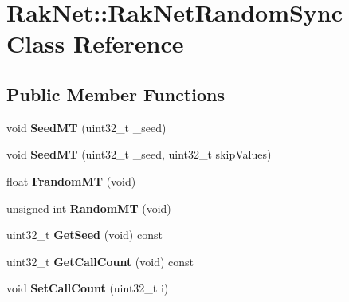 \hypertarget{class_rak_net_1_1_rak_net_random_sync}{\section{Rak\-Net\-:\-:Rak\-Net\-Random\-Sync Class Reference}
\label{class_rak_net_1_1_rak_net_random_sync}
}
\subsection*{Public Member Functions}
\begin{DoxyCompactItemize}
\item 
\hypertarget{class_rak_net_1_1_rak_net_random_sync_a60d45fe122a17dfc529191648cf7b9bb}{void {\bfseries Seed\-M\-T} (uint32\-\_\-t \-\_\-seed)}\label{class_rak_net_1_1_rak_net_random_sync_a60d45fe122a17dfc529191648cf7b9bb}

\item 
\hypertarget{class_rak_net_1_1_rak_net_random_sync_a207b74cdf4ad38f7853651647d5cb5b6}{void {\bfseries Seed\-M\-T} (uint32\-\_\-t \-\_\-seed, uint32\-\_\-t skip\-Values)}\label{class_rak_net_1_1_rak_net_random_sync_a207b74cdf4ad38f7853651647d5cb5b6}

\item 
\hypertarget{class_rak_net_1_1_rak_net_random_sync_a80dbe995268076fe3fe9ec5b611d093b}{float {\bfseries Frandom\-M\-T} (void)}\label{class_rak_net_1_1_rak_net_random_sync_a80dbe995268076fe3fe9ec5b611d093b}

\item 
\hypertarget{class_rak_net_1_1_rak_net_random_sync_add8a287303d50fd202e1e52ba598a3d8}{unsigned int {\bfseries Random\-M\-T} (void)}\label{class_rak_net_1_1_rak_net_random_sync_add8a287303d50fd202e1e52ba598a3d8}

\item 
\hypertarget{class_rak_net_1_1_rak_net_random_sync_ab79dfe0f144cf33200e9aece1726f5df}{uint32\-\_\-t {\bfseries Get\-Seed} (void) const }\label{class_rak_net_1_1_rak_net_random_sync_ab79dfe0f144cf33200e9aece1726f5df}

\item 
\hypertarget{class_rak_net_1_1_rak_net_random_sync_abfe36fdf4e63967fdc6c684b28fe29b8}{uint32\-\_\-t {\bfseries Get\-Call\-Count} (void) const }\label{class_rak_net_1_1_rak_net_random_sync_abfe36fdf4e63967fdc6c684b28fe29b8}

\item 
\hypertarget{class_rak_net_1_1_rak_net_random_sync_a64be7a370840a5cd6b3ae33625bad31f}{void {\bfseries Set\-Call\-Count} (uint32\-\_\-t i)}\label{class_rak_net_1_1_rak_net_random_sync_a64be7a370840a5cd6b3ae33625bad31f}


\end{DoxyCompactItemize}

